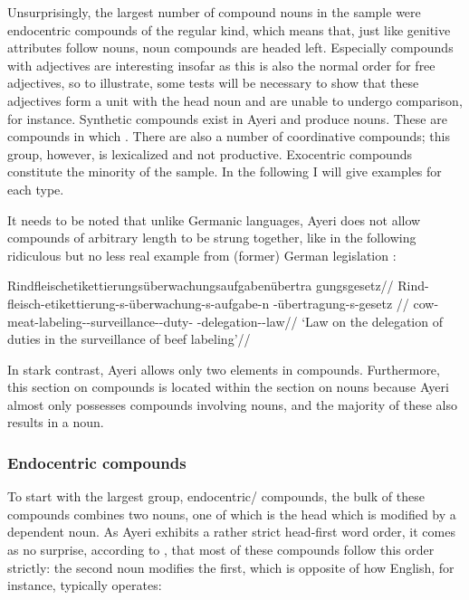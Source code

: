 Unsurprisingly, the largest number of compound nouns in the sample were
endocentric compounds of the regular kind, which means that, just like genitive
attributes follow nouns, noun compounds are headed left. Especially compounds
with adjectives are interesting insofar as this is also the normal order for
free adjectives, so to illustrate, some tests will be necessary to show that
these adjectives form a unit with the head noun and are unable to undergo
comparison, for instance. Synthetic compounds exist in Ayeri and produce nouns.
These are compounds in which . There are also a number of coordinative compounds; this
group, however, is lexicalized and not productive. Exocentric compounds
constitute the minority of the sample. In the following I will give examples
for each type.

It needs to be noted that unlike Germanic languages, Ayeri does not allow 
compounds of arbitrary length to be strung together, like in the following 
ridiculous but no less real example from (former) German legislation 
\parencite[see, for instance,][]{sz:rindfleisch}:

\ex\begingl{}%
	\gla %
Rind\-fleisch\-­eti\-ket\-tie\-rungs\-­über\-wa\-chungs\-­auf\-gaben\-über\-tra%
\-gungs\-gesetz//
	\glb Rind-fleisch-­etikettierung-s-­überwachung-s­-aufgabe-n%
		-übertragung-s-gesetz //
	\glc cow-meat-labeling-\Lnk{}-surveillance-\Lnk{}-duty-\Lnk{}%
		-delegation-\Lnk{}-law//
	\glft `Law on the delegation of duties in the surveillance of beef 
		labeling'//
\endgl\xe

In stark contrast, Ayeri allows only two elements in compounds. Furthermore,
this section on compounds is located within the section on nouns because Ayeri
almost only possesses compounds involving nouns, and the majority of these also
results in a noun.

\subsubsection{Endocentric compounds}
\label{subsubsec:endocomp}

To start with the largest group, endocentric/ compounds, the bulk
of these compounds combines two nouns, one of which is the head which is
modified by a dependent noun. As Ayeri exhibits a rather strict head-first word
order, it comes as no surprise, according to \citet{gaeta2008}, that most of
these compounds follow this order strictly: the second noun modifies the first,
which is opposite of how English, for instance, typically operates:

